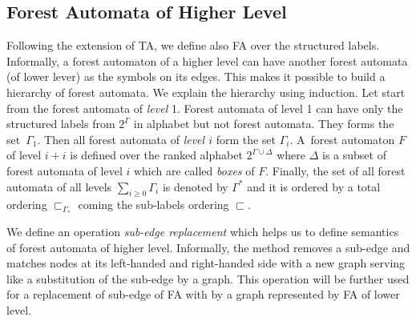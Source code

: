\subsection{Forest Automata of Higher Level}
\label{subsec:hfa}
Following the extension of TA, we define also FA over the structured labels.
Informally, a forest automaton of a higher level can have another forest automata (of lower lever) as the symbols on its edges.
This makes it possible to build a hierarchy of forest automata.
We explain the hierarchy using induction.
Let start from the forest automata of \emph{level} 1.
Forest automata of level 1 can have only the structured labels from $2^\Gamma$ in alphabet but not forest automata.
They forms the set~$\Gamma_1$.
Then all forest automata of \emph{level $i$} form the set $\Gamma_i$.
A~forest automaton $F$ of level $i+i$ is defined over the ranked alphabet $2^{\Gamma \cup \Delta}$ where $\Delta$ is a subset of forest automata of
level $i$ which are called \emph{boxes} of $F$.
Finally, the set of all forest automata of all levels $\sum_{i \geq 0} \Gamma_i$ is denoted by $\Gamma^{*}$ and
it is ordered by a total ordering $\sqsubset_{\Gamma_*}$ coming the sub-labels ordering $\sqsubset$.

We define an operation \emph{sub-edge replacement}
which helps us to define semantics of forest automata of higher level.
Informally, the method removes a sub-edge and matches nodes at its
left-handed and right-handed side with a new graph serving
like a substitution of the sub-edge by a graph.
This operation will be further used for a replacement of sub-edge of FA
with by a graph represented by FA of lower level.

